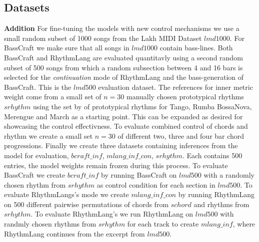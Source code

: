 \subsection{Datasets}
\textbf{Addition} For fine-tuning the models with new control mechanisms we use a small random subset of 1000 songs from the Lakh MIDI Dataset $lmd1000$. For BassCraft we make sure that all songs in $lmd1000$ contain bass-lines. Both BassCraft and RhythmLang are evaluated quantitavly using a second random subset of 500 songs from which a random subsection between 4 and 16 bars is selected for the \textit{continuation} mode of RhythmLang and the bass-generation of BassCraft. This is the $lmd500$ evaluation dataset. The references for inner metric weight come from a small set of $n=30$ manually chosen prototypical rhythms $srhythm$ using the set by \cite{Chew_Volk_Lee_Dance_metric_weight_2005} of prototypical rhythms for Tango, Rumba BossaNova, Merengue and March as a starting point. This can be expanded as desired for showcasing the control effectivness.
To evaluate combined control of chords and rhythm we create a small set $n=30$ of different two, three and four bar chord progressions.
Finally we create three datasets containing inferences from the model for evaluation, $bcraft\_inf$,  $mlang\_inf\_con$, $srhythm$. Each contains 500 entries, the model weights remain frozen during this process.  
To evaluate BassCraft we create $bcraft\_inf$ by running BassCraft on $lmd500$ with a randomly chosen rhythm from $srhythm$ as control condition for each section in $lmd500$. 
To evaluate RhythmLangs's  mode we create $mlang\_inf\_con$ by running RhythmLang on 500 different pairwise permutations of chords from $schord$ and rhythms from $srhythm$. 
To evaluate RhythmLang's  we run RhythmLang on $lmd500$ with randmly chosen rhythms from $srhythm$ for each track to create $mlang\_inf$, where RhythmLang continues from the excerpt from $lmd500$.  



